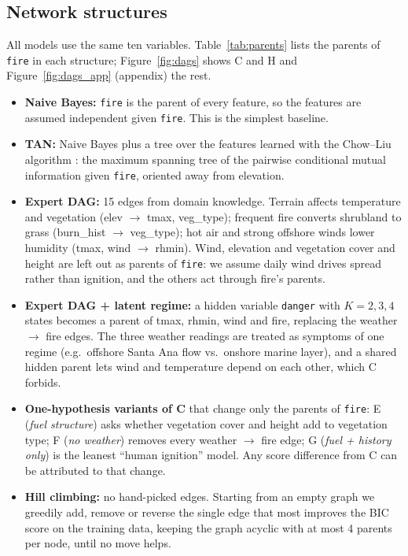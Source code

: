 \documentclass[11pt]{article}
\begin{document}
\subsection{Network structures}
All models use the same ten variables. Table~\ref{tab:parents} lists the parents of \texttt{fire} in each structure; Figure~\ref{fig:dags}
shows C and H and Figure~\ref{fig:dags_app} (appendix) the rest.
\begin{itemize}
  \item[A.] \textbf{Naive Bayes:} \texttt{fire} is the parent of every feature, so the features are
  assumed independent given \texttt{fire}. This is the simplest baseline.
  \item[B.] \textbf{TAN:} Naive Bayes plus a tree over the features learned with the Chow--Liu
  algorithm \cite{chowliu,tan}: the maximum spanning tree of the pairwise conditional mutual
  information given \texttt{fire}, oriented away from elevation.
  \item[C.] \textbf{Expert DAG:} 15 edges from domain knowledge. Terrain affects temperature and
  vegetation (elev $\to$ tmax, veg\_type); frequent fire converts shrubland to grass (burn\_hist $\to$
  veg\_type); hot air and strong offshore winds lower humidity (tmax, wind $\to$ rhmin). Wind,
  elevation and vegetation cover and height are left out as parents of \texttt{fire}: we assume
  daily wind drives spread rather than ignition, and the others act through fire's parents.
  \item[D.] \textbf{Expert DAG + latent regime:} a hidden variable \texttt{danger} with $K=2,3,4$
  states becomes a parent of tmax, rhmin, wind and fire, replacing the weather $\to$ fire edges.
  The three weather readings are treated as symptoms of one regime (e.g.\ offshore Santa Ana flow
  vs.\ onshore marine layer), and a shared hidden parent lets wind and temperature depend on each
  other, which C forbids.
  \item[E--G.] \textbf{One-hypothesis variants of C} that change only the parents of \texttt{fire}:
  E (\emph{fuel structure}) asks whether vegetation cover and height add to vegetation type;
  F (\emph{no weather}) removes every weather $\to$ fire edge; G (\emph{fuel + history only}) is
  the leanest ``human ignition'' model. Any score difference from C can be attributed to that change.
  \item[H.] \textbf{Hill climbing:} no hand-picked edges. Starting from an empty graph we greedily
  add, remove or reverse the single edge that most improves the BIC score on the training data,
  keeping the graph acyclic with at most 4 parents per node, until no move helps.
\end{itemize}
\end{document}
